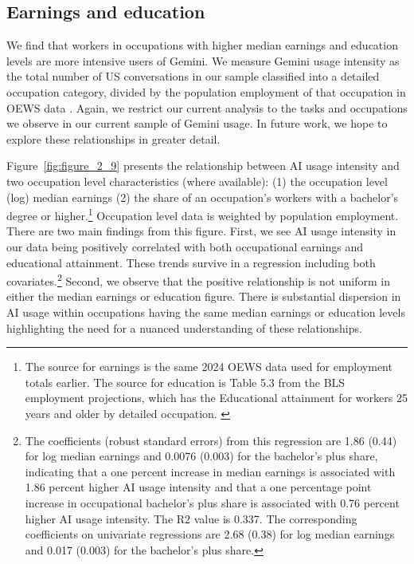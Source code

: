 \documentclass[11pt,a4paper]{article}
\begin{document}
\subsection{Earnings and education}

We find that workers in occupations with higher median earnings and education levels are more intensive users of Gemini. We measure Gemini usage intensity as the total number of US conversations in our sample classified into a detailed occupation category, divided by the population employment of that occupation in OEWS data \citep{bls_oews_2024}. Again, we restrict our current analysis to the tasks and occupations we observe in our current sample of Gemini usage. In future work, we hope to explore these relationships in greater detail.

Figure~\ref{fig:figure_2_9} presents the relationship between AI usage intensity and two occupation level characteristics (where available): (1) the occupation level (log) median earnings (2) the share of an occupation's workers with a bachelor's degree or higher.\footnote{The source for earnings is the same 2024 OEWS data used for employment totals earlier. The source for education is Table 5.3 from the BLS employment projections, which has the Educational attainment for workers 25 years and older by detailed occupation. \citep{bls_educ_attainment}} Occupation level data is weighted by population employment. There are two main findings from this figure. First, we see AI usage intensity in our data being positively correlated with both occupational earnings and educational attainment. These trends survive in a regression including both covariates.\footnote{The coefficients (robust standard errors) from this regression are 1.86 (0.44) for log median earnings and 0.0076 (0.003) for the bachelor's plus share, indicating that a one percent increase in median earnings is associated with 1.86 percent higher AI usage intensity and that a one percentage point increase in occupational bachelor's plus share is associated with 0.76 percent higher AI usage intensity. The R2 value is 0.337. The corresponding coefficients on univariate regressions are 2.68 (0.38) for log median earnings and 0.017 (0.003) for the bachelor's plus share.} Second, we observe that the positive relationship is not uniform in either the median earnings or education figure. There is substantial dispersion in AI usage within occupations having the same median earnings or education levels highlighting the need for a nuanced understanding of these relationships.
\end{document}
